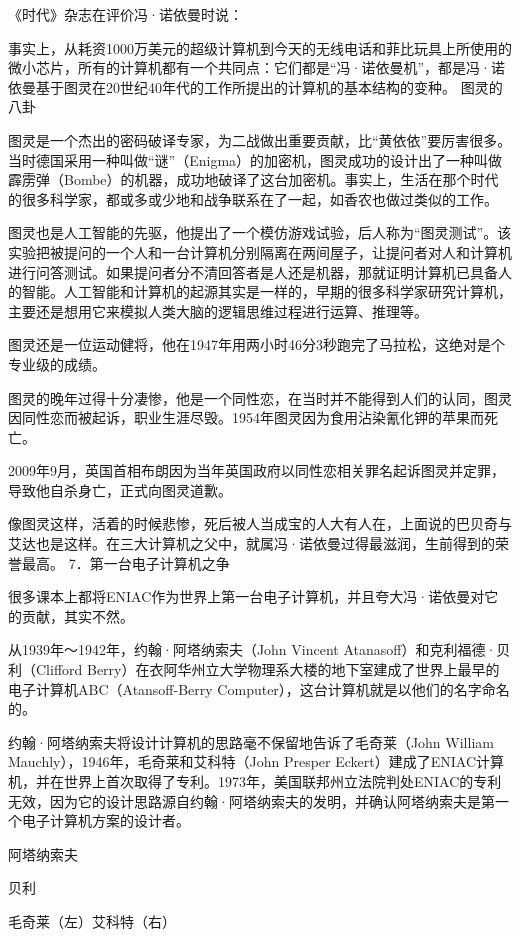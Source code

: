 \documentclass[12pt,UTF8]{ctexbook}
\begin{document}
《时代》杂志在评价冯·诺依曼时说：

事实上，从耗资1000万美元的超级计算机到今天的无线电话和菲比玩具上所使用的微小芯片，所有的计算机都有一个共同点：它们都是“冯·诺依曼机”，都是冯·诺依曼基于图灵在20世纪40年代的工作所提出的计算机的基本结构的变种。
图灵的八卦

图灵是一个杰出的密码破译专家，为二战做出重要贡献，比“黄依依”要厉害很多。当时德国采用一种叫做“谜”（Enigma）的加密机，图灵成功的设计出了一种叫做霹雳弹（Bombe）的机器，成功地破译了这台加密机。事实上，生活在那个时代的很多科学家，都或多或少地和战争联系在了一起，如香农也做过类似的工作。

图灵也是人工智能的先驱，他提出了一个模仿游戏试验，后人称为“图灵测试”。该实验把被提问的一个人和一台计算机分别隔离在两间屋子，让提问者对人和计算机进行问答测试。如果提问者分不清回答者是人还是机器，那就证明计算机已具备人的智能。人工智能和计算机的起源其实是一样的，早期的很多科学家研究计算机，主要还是想用它来模拟人类大脑的逻辑思维过程进行运算、推理等。

图灵还是一位运动健将，他在1947年用两小时46分3秒跑完了马拉松，这绝对是个专业级的成绩。

图灵的晚年过得十分凄惨，他是一个同性恋，在当时并不能得到人们的认同，图灵因同性恋而被起诉，职业生涯尽毁。1954年图灵因为食用沾染氰化钾的苹果而死亡。

2009年9月，英国首相布朗因为当年英国政府以同性恋相关罪名起诉图灵并定罪，导致他自杀身亡，正式向图灵道歉。

像图灵这样，活着的时候悲惨，死后被人当成宝的人大有人在，上面说的巴贝奇与艾达也是这样。在三大计算机之父中，就属冯·诺依曼过得最滋润，生前得到的荣誉最高。
7．第一台电子计算机之争

很多课本上都将ENIAC作为世界上第一台电子计算机，并且夸大冯·诺依曼对它的贡献，其实不然。

从1939年～1942年，约翰·阿塔纳索夫（John Vincent Atanasoff）和克利福德·贝利（Clifford Berry）在衣阿华州立大学物理系大楼的地下室建成了世界上最早的电子计算机ABC（Atansoff-Berry Computer），这台计算机就是以他们的名字命名的。

约翰·阿塔纳索夫将设计计算机的思路毫不保留地告诉了毛奇莱（John William Mauchly），1946年，毛奇莱和艾科特（John Presper Eckert）建成了ENIAC计算机，并在世界上首次取得了专利。1973年，美国联邦州立法院判处ENIAC的专利无效，因为它的设计思路源自约翰·阿塔纳索夫的发明，并确认阿塔纳索夫是第一个电子计算机方案的设计者。

阿塔纳索夫

贝利

毛奇莱（左）艾科特（右）
\end{document}
